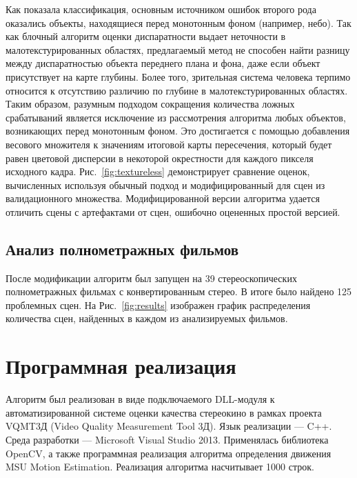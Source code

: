 \documentclass[14pt, a4paper]{extarticle}
\begin{document}


Как показала классификация, основным источником ошибок второго рода оказались
объекты, находящиеся перед монотонным фоном (например, небо). Так как блочный
алгоритм оценки диспаратности выдает неточности в малотекстурированных 
областях, предлагаемый метод не способен найти разницу между диспаратностью
объекта переднего плана и фона, даже если объект присутствует на карте глубины.
Более того, зрительная система человека терпимо относится к отсутствию различию
по глубине в малотекстурированных областях. Таким образом, разумным подходом
сокращения количества ложных срабатываний  является исключение из рассмотрения
алгоритма любых объектов, возникающих перед монотонным фоном. Это достигается
с помощью добавления весового множителя к значениям итоговой карты пересечения,
который будет равен цветовой дисперсии в некоторой окрестности для
каждого пикселя исходного кадра. Рис.~\ref{fig:textureless} демонстрирует
сравнение оценок, вычисленных используя обычный подход и модифицированный 
для сцен из валидационного множества. Модифицированной версии алгоритма удается
отличить сцены с артефактами от сцен, ошибочно оцененных простой версией.

\subsection{Анализ полнометражных фильмов}



После модификации алгоритм был запущен на 39 стереоскопических полнометражных
фильмах с конвертированным стерео. В итоге было найдено 125 проблемных сцен. 
На Рис.~\ref{fig:results} изображен график распределения количества сцен, 
найденных в каждом из анализируемых фильмов.



\newpage
\newpage
\newpage
\clearpage
\section{Программная реализация}

Алгоритм был реализован в виде подключаемого DLL-модуля к автоматизированной 
системе оценки качества стереокино в рамках проекта VQMT3Д 
(Video Quality Measurement Tool 3Д). Язык реализации --- C++. Среда разработки --- 
Microsoft Visual Studio 2013. Применялась библиотека OpenCV, а также программная 
реализация алгоритма определения движения MSU Motion Estimation. 
Реализация алгоритма насчитывает 1000 строк. 
\end{document}
